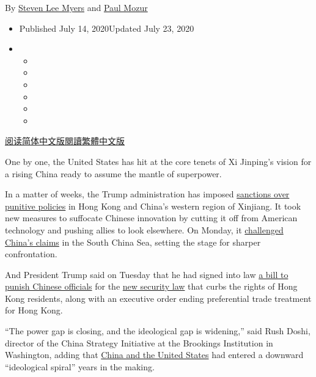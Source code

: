 By \href{https://www.nytimes.com/by/steven-lee-myers}{Steven Lee Myers}
and \href{https://www.nytimes.com/by/paul-mozur}{Paul Mozur}

\begin{itemize}
\item
  Published July 14, 2020Updated July 23, 2020
\item
  \begin{itemize}
  \item
  \item
  \item
  \item
  \item
  \item
  \end{itemize}
\end{itemize}

\href{https://cn.nytimes.com/asia-pacific/20200715/cold-war-china-us/}{阅读简体中文版}\href{https://cn.nytimes.com/asia-pacific/20200715/cold-war-china-us/zh-hant/}{閱讀繁體中文版}

One by one, the United States has hit at the core tenets of Xi Jinping's
vision for a rising China ready to assume the mantle of superpower.

In a matter of weeks, the Trump administration has imposed
\href{https://www.nytimes.com/2020/06/29/business/economy/us-halts-high-tech-exports-hong-kong.html}{sanctions
over punitive policies} in Hong Kong and China's western region of
Xinjiang. It took new measures to suffocate Chinese innovation by
cutting it off from American technology and pushing allies to look
elsewhere. On Monday, it
\href{https://www.nytimes.com/2020/07/13/world/asia/south-china-sea-pompeo.html}{challenged
China's claims} in the South China Sea, setting the stage for sharper
confrontation.

And President Trump said on Tuesday that he had signed into law
\href{https://www.nytimes.com/2020/07/02/us/politics/senate-china-hong-kong-sanctions.html}{a
bill to punish Chinese officials} for the
\href{https://www.nytimes.com/2020/06/29/world/asia/china-hong-kong-security-law-rules.html}{new
security law} that curbs the rights of Hong Kong residents, along with
an executive order ending preferential trade treatment for Hong Kong.

``The power gap is closing, and the ideological gap is widening,'' said
Rush Doshi, director of the China Strategy Initiative at the Brookings
Institution in Washington, adding that
\href{https://www.nytimes.com/2020/07/23/world/asia/us-china-consulate.html}{China
and the United States} had entered a downward ``ideological spiral''
years in the making.

